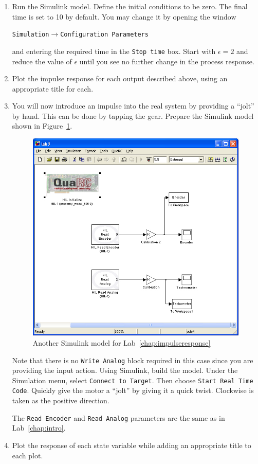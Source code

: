 \begin{enumerate}
\item Run the \textsf{Simulink} model. Define the initial conditions to be
zero.  The final time is set to 10 by default.  You may change it by opening
the window
\begin{center}
\verb|Simulation|$\rightarrow$\verb|Configuration Parameters|
\end{center}
and entering the required time in the \verb|Stop time| box.  Start with
$\epsilon=2$ and reduce the value of $\epsilon$ until you see no further
change in the process response.

\item Plot the impulse response for each output described above, using an
appropriate title for each.

\item You will now introduce an impulse into the real system by providing a
``jolt'' by hand. This can be done by tapping the gear.  Prepare the
\textsf{Simulink} model shown in Figure~\ref{fig:model3a}.
\begin{figure}[htbp]
\centering
\includegraphics[width=0.6\hsize]{pix/lab3a.jpg}
\caption{Another \textsf{Simulink} model for Lab~\ref{chap:impulseresponse}}\label{fig:model3a}
\end{figure}%
Note that there is no \verb|Write Analog| block required in this case since you are providing the input action.  Using \textsf{Simulink}\@, build the model. Under the Simulation menu, select \verb|Connect to Target|. Then choose \verb|Start Real Time Code|.  Quickly give the motor a ``jolt'' by giving it a quick twist.  Clockwise is taken as the positive direction.

The \verb|Read Encoder| and \verb|Read Analog| parameters are the same as in
Lab~\ref{chap:intro}\@.

\item Plot the response of each state variable while adding an appropriate
title to each plot.


\end{enumerate}
